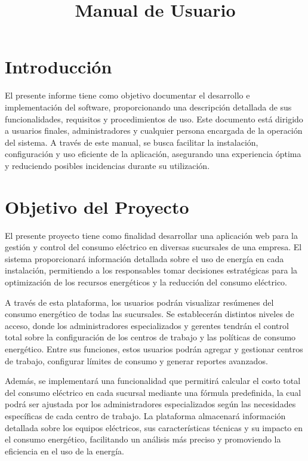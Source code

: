\documentclass{article}
\title{Manual de Usuario}
\author{}
\date{}
\begin{document}
\maketitle

\section*{Introducción}
El presente informe tiene como objetivo documentar el desarrollo e implementación del software, proporcionando una descripción detallada de sus funcionalidades, 
requisitos y procedimientos de uso. Este documento está dirigido a usuarios finales, administradores y cualquier persona encargada de la operación del sistema. A 
través de este manual, se busca facilitar la instalación, configuración y uso eficiente de la aplicación, asegurando una experiencia óptima y reduciendo posibles 
incidencias durante su utilización.

\section*{Objetivo del Proyecto}

El presente proyecto tiene como finalidad desarrollar una aplicación web para la gestión y control del consumo eléctrico en diversas sucursales de una empresa. El 
sistema proporcionará información detallada sobre el uso de energía en cada instalación, permitiendo a los responsables tomar decisiones estratégicas para la 
optimización de los recursos energéticos y la reducción del consumo eléctrico.

A través de esta plataforma, los usuarios podrán visualizar resúmenes del consumo energético de todas las sucursales. Se establecerán distintos niveles de acceso, 
donde los administradores especializados y gerentes tendrán el control total sobre la configuración de los centros de trabajo y las políticas de consumo energético. 
Entre sus funciones, estos usuarios podrán agregar y gestionar centros de trabajo, configurar límites de consumo y generar reportes avanzados.

Además, se implementará una funcionalidad que permitirá calcular el costo total del consumo eléctrico en cada sucursal mediante una fórmula predefinida, la cual 
podrá ser ajustada por los administradores especializados según las necesidades específicas de cada centro de trabajo. La plataforma almacenará información detallada 
sobre los equipos eléctricos, sus características técnicas y su impacto en el consumo energético, facilitando un análisis más preciso y promoviendo la eficiencia en 
el uso de la energía.
\end{document}
